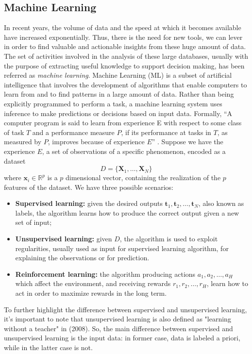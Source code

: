 \subsection{Machine Learning}
\label{subsec:ml}
In recent years, the volume of data and the speed at which it becomes available have increased exponentially. Thus, there is the need for new tools, we can lever in order to find valuable and actionable insights from these huge amount of data. The set of activities involved in the analysis of these large databases, usually with the purpose of extracting useful knowledge to support decision making, has been referred as \emph{machine learning}\cite{vercellis_business_2009}. Machine Learning (ML) is a subset of artificial intelligence that involves the development of algorithms that enable computers to learn from and to find patterns in a large amount of data. Rather than being explicitly programmed to perform a task, a machine learning system uses inference to make predictions or decisions based on input data. Formally, “A computer program is said to learn from experience E with respect to some class of task $T$ and a performance measure $P$, if its performance at tasks in $T$, as measured by $P$, improves because of experience $E$” \cite{zaki_data_2020, pierluca_lanzi_data_2021}. Suppose we have the experience $E$, a set of observations of a specific phenomenon, encoded as a dataset
\begin{equation}
    \label{eq:dataset}
    D=\{\mathbf{X}_1, \dots, \mathbf{X}_N\} 
\end{equation}
where $\mathbf{x}_i\in \mathbb{R}^p$ is a $p$ dimensional vector, containing the realization of the $p$ features of the dataset. We have three possible scenarios:
\begin{itemize}
    \item \textbf{Supervised learning:} given the desired outputs $\textbf{t}_1, \textbf{t}_2, \dots, \textbf{t}_N$, also known as labels, the algorithm learns how to produce the correct output given a new set of input;
    \item \textbf{Unsupervised learning:} given $D$, the algorithm is used to exploit regularities, usually used as input for supervised learning algorithm, for explaining the observations or for prediction.
    \item \textbf{Reinforcement learning:} the algorithm producing actions $a_1, a_2, \dots, a_H$ which affect the environment, and receiving rewards $r_1, r_2, \dots, r_H$, learn how to act in order to maximize rewards in the long term.
\end{itemize}
To further highlight the difference between supervised and unsupervised learning, it's important to note that unsupervised learning is also defined as "learning without a teacher" in \citeauthor{tibshirani_elements_2008} (2008). So, the main difference between supervised and unsupervised learning is the input data: in former case, data is labeled a priori, while in the latter case is not. 

